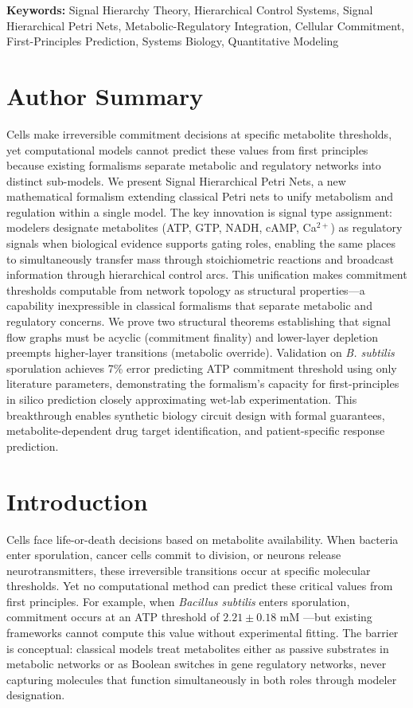 \documentclass[10pt,letterpaper]{article}
\begin{document}
\vspace{6pt}
\noindent\textbf{Keywords:} Signal Hierarchy Theory, Hierarchical Control Systems, Signal Hierarchical Petri Nets, Metabolic-Regulatory Integration, Cellular Commitment, First-Principles Prediction, Systems Biology, Quantitative Modeling

\section*{Author Summary}

Cells make irreversible commitment decisions at specific metabolite thresholds, yet computational models cannot predict these values from first principles because existing formalisms separate metabolic and regulatory networks into distinct sub-models. We present Signal Hierarchical Petri Nets, a new mathematical formalism extending classical Petri nets to unify metabolism and regulation within a single model. The key innovation is signal type assignment: modelers designate metabolites (ATP, GTP, NADH, cAMP, Ca$^{2+}$) as regulatory signals when biological evidence supports gating roles, enabling the same places to simultaneously transfer mass through stoichiometric reactions and broadcast information through hierarchical control arcs. This unification makes commitment thresholds computable from network topology as structural properties---a capability inexpressible in classical formalisms that separate metabolic and regulatory concerns. We prove two structural theorems establishing that signal flow graphs must be acyclic (commitment finality) and lower-layer depletion preempts higher-layer transitions (metabolic override). Validation on \textit{B. subtilis} sporulation achieves 7\% error predicting ATP commitment threshold using only literature parameters, demonstrating the formalism's capacity for first-principles in silico prediction closely approximating wet-lab experimentation. This breakthrough enables synthetic biology circuit design with formal guarantees, metabolite-dependent drug target identification, and patient-specific response prediction.

\section{Introduction}

Cells face life-or-death decisions based on metabolite availability. When bacteria enter sporulation, cancer cells commit to division, or neurons release neurotransmitters, these irreversible transitions occur at specific molecular thresholds. Yet no computational method can predict these critical values from first principles. For example, when \textit{Bacillus subtilis} enters sporulation, commitment occurs at an ATP threshold of $2.21 \pm 0.18$ mM \cite{fujita2005}---but existing frameworks cannot compute this value without experimental fitting. The barrier is conceptual: classical models treat metabolites either as passive substrates in metabolic networks or as Boolean switches in gene regulatory networks, never capturing molecules that function simultaneously in both roles through modeler designation.
\end{document}
